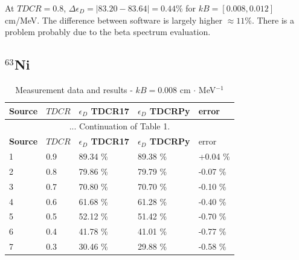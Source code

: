\documentclass[12pt]{iopart}
\begin{document}
At $TDCR = 0.8$, $\Delta \epsilon_D = |83.20 - 83.64| = 0.44 \%$ for $kB = [0.008, 0.012]$ cm/MeV. The difference between software is largely higher $\approx 11 \%$. There is a problem probably due to the beta spectrum evaluation. 


\pagebreak
\subsection{$^{63}$Ni}

\begingroup
\footnotesize
\begin{longtable}[l]{| p{} | p{} |p{} |p{} |p{} |} 
\caption{Measurement data and results - $kB = 0.008$ cm $\cdot$ MeV$^{-1}$}
\label{Table1} \\ 
\hline
\textbf{Source} & \textbf{$TDCR$} & \textbf{$\epsilon_{D}$ TDCR17} & \textbf{$\epsilon_{D}$ TDCRPy} & error \\
\endfirsthead
\multicolumn{5}{c}{... Continuation of Table 1.}\\ 
\hline
 \textbf{Source} & \textbf{$TDCR$} & \textbf{$\epsilon_{D}$ TDCR17} & \textbf{$\epsilon_{D}$ TDCRPy} & error \\   \hline 
\endhead
\hline
 1 & 0.9   &   89.34 \% &   89.38 \% &  +0.04 \% \\
 2 & 0.8   &   79.86 \% &   79.79 \% &  -0.07 \% \\
 3 & 0.7   &   70.80 \% &   70.70 \% &  -0.10 \% \\
 4 & 0.6   &   61.68 \% &   61.28 \% &  -0.40 \% \\
 5 & 0.5   &   52.12 \% &   51.42 \% &  -0.70 \% \\
 6 & 0.4   &   41.78 \% &   41.01 \% &  -0.77 \% \\
 7 & 0.3   &   30.46 \% &   29.88 \% &  -0.58 \% \\
\hline
\end{longtable} 
\endgroup
\end{document}
